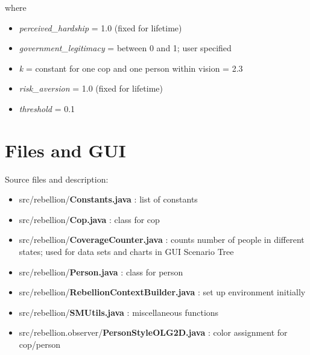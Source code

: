 \documentclass[11pt]{amsart}
\begin{document}
where 
\begin{itemize}
\item[] \emph{perceived\_hardship} = 1.0 (fixed for lifetime) 
\item[] \emph{government\_legitimacy} = between 0 and 1; user specified 
\item[] \emph{k} = constant for one cop and one person within vision = 2.3 
\item[] \emph{risk\_aversion} = 1.0 (fixed for lifetime) 
\item[] \emph{threshold} = 0.1 
\end{itemize}

\section{Files and GUI}

Source files and description:
\begin{itemize}
\item[] src/rebellion/\textbf{Constants.java} : list of constants
\item[] src/rebellion/\textbf{Cop.java} : class for cop
\item[] src/rebellion/\textbf{CoverageCounter.java} : counts number of people in different states; used for data sets and charts in GUI Scenario Tree
\item[] src/rebellion/\textbf{Person.java} : class for person
\item[] src/rebellion/\textbf{RebellionContextBuilder.java} : set up environment initially
\item[] src/rebellion/\textbf{SMUtils.java} : miscellaneous functions
\item[] src/rebellion.observer/\textbf{PersonStyleOLG2D.java} : color assignment for cop/person
\end{itemize}
\end{document}
